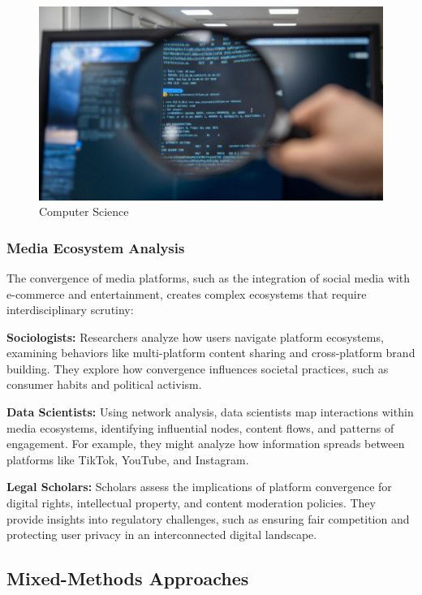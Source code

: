 \documentclass[
]{book}
\begin{document}
\begin{figure}
\centering
\includegraphics[width=1\linewidth,height=\textheight,keepaspectratio]{images/compsci.jpg}
\caption{Computer Science}
\end{figure}

\subsubsection*{Media Ecosystem Analysis}\label{media-ecosystem-analysis}

The convergence of media platforms, such as the integration of social media with e-commerce and entertainment, creates complex ecosystems that require interdisciplinary scrutiny:

\textbf{Sociologists:} Researchers analyze how users navigate platform ecosystems, examining behaviors like multi-platform content sharing and cross-platform brand building. They explore how convergence influences societal practices, such as consumer habits and political activism.

\textbf{Data Scientists:} Using network analysis, data scientists map interactions within media ecosystems, identifying influential nodes, content flows, and patterns of engagement. For example, they might analyze how information spreads between platforms like TikTok, YouTube, and Instagram.

\textbf{Legal Scholars:} Scholars assess the implications of platform convergence for digital rights, intellectual property, and content moderation policies. They provide insights into regulatory challenges, such as ensuring fair competition and protecting user privacy in an interconnected digital landscape.

\subsection*{Mixed-Methods Approaches}\label{mixed-methods-approaches}
\end{document}
